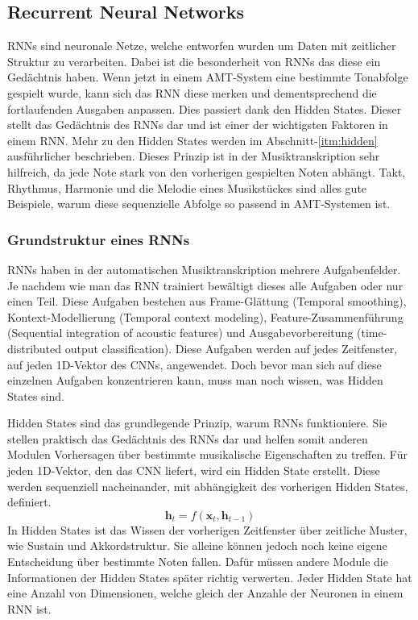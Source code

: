 \subsection{Recurrent Neural Networks}
RNNs sind neuronale Netze, welche entworfen wurden um Daten mit zeitlicher Struktur zu verarbeiten.
Dabei ist die besonderheit von RNNs das diese ein Gedächtnis haben.
Wenn jetzt in einem AMT-System eine bestimmte Tonabfolge gespielt wurde,
kann sich das RNN diese merken und dementsprechend die fortlaufenden Ausgaben anpassen.
Dies passiert dank den Hidden States.
Dieser stellt das Gedächtnis des RNNs dar und ist einer der wichtigsten Faktoren in einem RNN\@.
Mehr zu den Hidden States werden im Abschnitt-\ref{itm:hidden} ausführlicher beschrieben.
Dieses Prinzip ist in der Musiktranskription sehr hilfreich,
da jede Note stark von den vorherigen gespielten Noten abhängt.
Takt, Rhythmus, Harmonie und die Melodie eines Musikstückes sind alles gute Beispiele,
warum diese sequenzielle Abfolge so passend in AMT-Systemen ist.

\subsubsection{Grundstruktur eines RNNs}
RNNs haben in der automatischen Musiktranskription mehrere Aufgabenfelder.
Je nachdem wie man das RNN trainiert bewältigt dieses alle Aufgaben oder nur einen Teil.
Diese Aufgaben bestehen aus Frame-Glättung (Temporal smoothing), Kontext-Modellierung (Temporal context modeling),
Feature-Zusammenführung (Sequential integration of acoustic features)
und Ausgabevorbereitung (time-distributed output classification).
Diese Aufgaben werden auf jedes Zeitfenster, auf jeden 1D-Vektor des CNNs, angewendet.
Doch bevor man sich auf diese einzelnen Aufgaben konzentrieren kann, muss man noch wissen, was Hidden States sind.

\begin{description}[style=nextline]
\item[Hidden States]\label{itm:hidden}
Hidden States sind das grundlegende Prinzip, warum RNNs funktioniere.
Sie stellen praktisch das Gedächtnis des RNNs dar und helfen somit
anderen Modulen Vorhersagen über bestimmte musikalische Eigenschaften zu treffen.
Für jeden 1D-Vektor, den das CNN liefert, wird ein Hidden State erstellt.
Diese werden sequenziell nacheinander, mit abhängigkeit des vorherigen Hidden States, definiert.
\[
\mathbf{h}_t = f(\mathbf{x}_t, \mathbf{h}_{t-1})
\]
In Hidden States ist das Wissen der vorherigen Zeitfenster über zeitliche Muster, wie Sustain und Akkordstruktur.
Sie alleine können jedoch noch keine eigene Entscheidung über bestimmte Noten fallen.
Dafür müssen andere Module die Informationen der Hidden States später richtig verwerten.
Jeder Hidden State hat eine Anzahl von Dimensionen, welche gleich der Anzahle der Neuronen in einem RNN ist.
\end{description}

